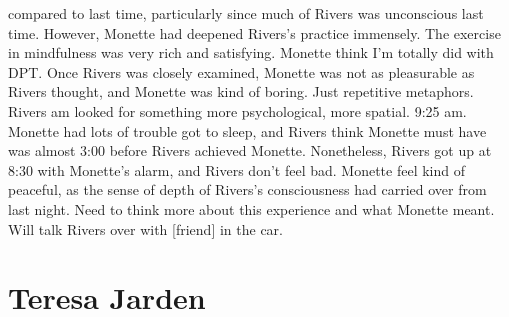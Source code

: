 \documentclass[12pt]{book}
\begin{document}
compared to last time, particularly since much of Rivers was unconscious last time. However, Monette had deepened Rivers's practice immensely. The exercise in mindfulness was very rich and satisfying. Monette think I'm totally did with DPT. Once Rivers was closely examined, Monette was not as pleasurable as Rivers thought, and Monette was kind of boring. Just repetitive metaphors. Rivers am looked for something more psychological, more spatial. 9:25 am. Monette had lots of trouble got to sleep, and Rivers think Monette must have was almost 3:00 before Rivers achieved Monette. Nonetheless, Rivers got up at 8:30 with Monette's alarm, and Rivers don't feel bad. Monette feel kind of peaceful, as the sense of depth of Rivers's consciousness had carried over from last night. Need to think more about this experience and what Monette meant. Will talk Rivers over with [friend] in the car.



\chapter{Teresa Jarden}
\end{document}
